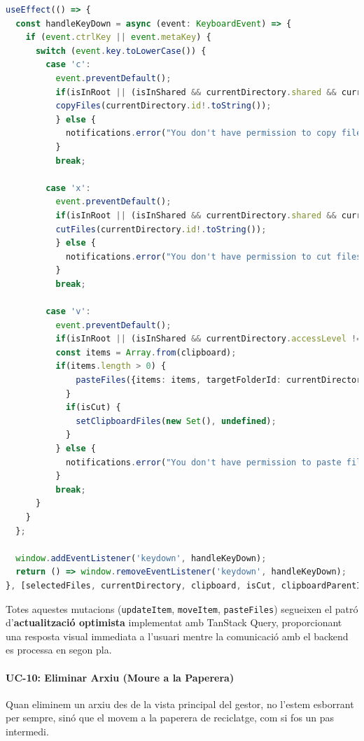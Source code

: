 \begin{lstlisting}[language=typescript, caption={Gestió de dreceres de teclat a `useFileShortcuts.ts`}]
useEffect(() => {
  const handleKeyDown = async (event: KeyboardEvent) => {
    if (event.ctrlKey || event.metaKey) {
      switch (event.key.toLowerCase()) {
        case 'c':
          event.preventDefault();
          if(isInRoot || (isInShared && currentDirectory.shared && currentDirectory.accessLevel !== 'READ')) {
          copyFiles(currentDirectory.id!.toString());
          } else {
            notifications.error("You don't have permission to copy files");
          }
          break;

        case 'x':
          event.preventDefault();
          if(isInRoot || (isInShared && currentDirectory.shared && currentDirectory.accessLevel !== 'read')) {
          cutFiles(currentDirectory.id!.toString());
          } else {
            notifications.error("You don't have permission to cut files");
          }
          break;

        case 'v':
          event.preventDefault();
          if(isInRoot || (isInShared && currentDirectory.accessLevel !== 'read')) {
          const items = Array.from(clipboard);
          if(items.length > 0) {
              pasteFiles({items: items, targetFolderId: currentDirectory.id!.toString(), prevParentId: clipboardParentId, isCut: isCut});
            }
            if(isCut) {
              setClipboardFiles(new Set(), undefined);
            }
          } else {
            notifications.error("You don't have permission to paste files");
          }
          break;
      }
    }
  };

  window.addEventListener('keydown', handleKeyDown);
  return () => window.removeEventListener('keydown', handleKeyDown);
}, [selectedFiles, currentDirectory, clipboard, isCut, clipboardParentId, /* ... */]);
\end{lstlisting}

Totes aquestes mutacions (\texttt{updateItem}, \texttt{moveItem}, \texttt{pasteFiles}) segueixen el patró d'\textbf{actualització optimista} implementat amb TanStack Query, proporcionant una resposta visual immediata a l'usuari mentre la comunicació amb el backend es processa en segon pla. 

\paragraph{UC-10: Eliminar Arxiu (Moure a la Paperera)}
Quan eliminem un arxiu des de la vista principal del gestor, no l'estem esborrant per sempre, sinó que el movem a la paperera de reciclatge, com si fos un pas intermedi.

